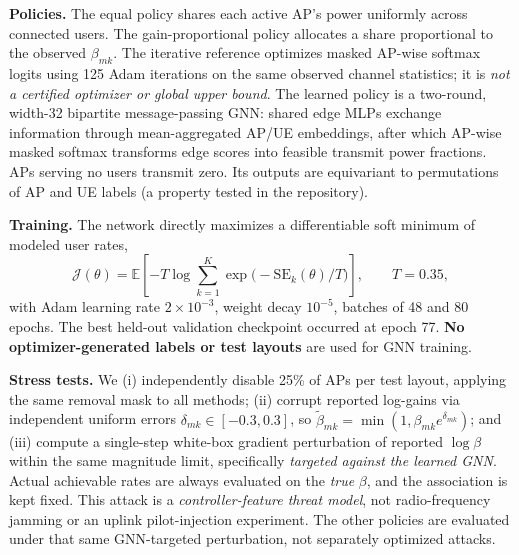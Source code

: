 \documentclass[10pt,a4paper]{article}
\begin{document}
\textbf{Policies.} The equal policy shares each active AP's power uniformly across connected users. The gain-proportional policy allocates a share proportional to the observed $\beta_{mk}$. The iterative reference optimizes masked AP-wise softmax logits using 125 Adam iterations on the same observed channel statistics; it is \emph{not a certified optimizer or global upper bound}. The learned policy is a two-round, width-32 bipartite message-passing GNN: shared edge MLPs exchange information through mean-aggregated AP/UE embeddings, after which AP-wise masked softmax transforms edge scores into feasible transmit power fractions. APs serving no users transmit zero. Its outputs are equivariant to permutations of AP and UE labels (a property tested in the repository).

\textbf{Training.} The network directly maximizes a differentiable soft minimum of modeled user rates,
\begin{equation}
\mathcal{J}(\theta)=\mathbb{E}\left[-T\log\sum_{k=1}^K\exp\big(-\mathrm{SE}_k(\theta)/T\big)\right],\qquad T=0.35,
\end{equation}
with Adam learning rate $2\times10^{-3}$, weight decay $10^{-5}$, batches of 48 and 80 epochs. The best held-out validation checkpoint occurred at epoch 77. \textbf{No optimizer-generated labels or test layouts} are used for GNN training.

\textbf{Stress tests.} We (i) independently disable 25\% of APs per test layout, applying the same removal mask to all methods; (ii) corrupt reported log-gains via independent uniform errors $\delta_{mk}\in[-0.3,0.3]$, so $\widetilde\beta_{mk}=\min(1,\beta_{mk}e^{\delta_{mk}})$; and (iii) compute a single-step white-box gradient perturbation of reported $\log\beta$ within the same magnitude limit, specifically \emph{targeted against the learned GNN}. Actual achievable rates are always evaluated on the \emph{true} $\beta$, and the association is kept fixed. This attack is a \emph{controller-feature threat model}, not radio-frequency jamming or an uplink pilot-injection experiment. The other policies are evaluated under that same GNN-targeted perturbation, not separately optimized attacks.
\end{document}
